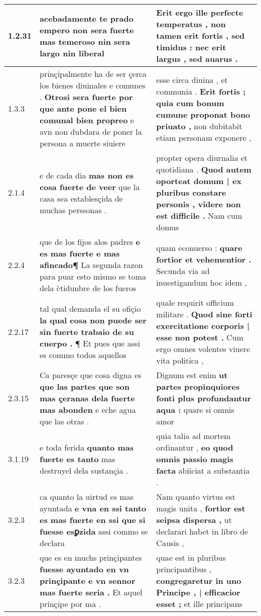 \begin{tabular}{|p{1cm}|p{6.5cm}|p{6.5cm}|}
1.2.31 & acebadamente te prado \textbf{ empero non sera fuerte mas temeroso } nin sera largo nin liberal & Erit ergo ille perfecte temperatus , \textbf{ non tamen erit fortis , sed timidus : } nec erit largus , sed auarus . \\\hline
1.3.3 & prinçipalmente ha de ser çerca los bienes diuinales e comunes . \textbf{ Otrosi sera fuerte por que ante pone el bien comunal bien propreo } e avn non dubdara de poner la persona a muerte siuiere & esse circa diuina , et communia . \textbf{ Erit fortis ; quia cum bonum cumune proponat bono priuato , } non dubitabit etiam personam exponere , \\\hline
2.1.4 & e de cada dia \textbf{ mas non es cosa fuerte de veer } que la casa sea establesçida de muchas perssonas . & propter opera diurnalia et quotidiana . \textbf{ Quod autem oporteat domum | ex pluribus constare personis , videre non est difficile . } Nam cum domus \\\hline
2.2.4 & que de los fijos alos padres \textbf{ e es mas fuerte e mas afincado¶ } La segunda razon para puar esto mismo se toma dela c̀tidunbre de los fueros & quam econuerso : \textbf{ quare fortior et vehementior . } Secunda via ad inuestigandum hoc idem , \\\hline
2.2.17 & tal qual demanda el su ofiçio \textbf{ la qual cosa non puede ser sin fuerte trabaio de su cuerpo . } ¶ Et pues que assi es commo todos aquellos & quale requirit officium militare . \textbf{ Quod sine forti exercitatione corporis | esse non potest . } Cum ergo omnes volentes viuere vita politica , \\\hline
2.3.15 & Ca paresçe que cosa digna es \textbf{ que las partes que son mas çeranas dela fuerte mas abonden } e eche agua que las otras . & Dignum est enim \textbf{ ut partes propinquiores fonti plus profundantur aqua : } quare si omnis amor \\\hline
3.1.19 & e toda ferida \textbf{ quanto mas fuerte es tanto } mas destruyel dela sustançia . & quia talia ad mortem ordinantur , \textbf{ eo quod omnis passio magis facta } abiiciat a substantia . \\\hline
3.2.3 & ca quanto la uirtud es mas ayuntada \textbf{ e vna en ssi tanto es mas fuerte en ssi que si fuesse esꝑzida } assi commo se declara & Nam quanto virtus est magis unita , \textbf{ fortior est seipsa dispersa , } ut declarari habet in libro de Causis , \\\hline
3.2.3 & que es en muchs prinçipantes \textbf{ fuesse ayuntado en vn prinçipante e vn sennor mas fuerte seria . } Et aquel prinçipe por ma . & quae est in pluribus principantibus , \textbf{ congregaretur in uno Principe , | efficacior esset ; } et ille principans \\\hline

\end{tabular}
